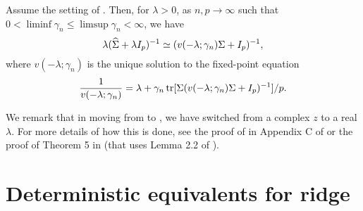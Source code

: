 \documentclass{article}
\begin{document}
\begin{corollary}
    \label{cor:basic-ridge-resolvent-equivalent-in-v}
    Assume the setting of 
    .
    Then, for $\lambda > 0$,
    as $n, p \to \infty$
    such that $0 < \liminf \gamma_n \le \limsup \gamma_n < \infty$,
    we have
    \[
        \lambda ({\widehat{\Sigma}} + \lambda I_p)^{-1}
        \simeq
        (v(-\lambda; \gamma_n) \Sigma + I_p)^{-1},
    \]
    where $v(-\lambda; \gamma_n)$
    is the unique solution to the fixed-point equation
    \[
        \frac{1}{v(-\lambda; \gamma_n)}
        =
        \lambda
        + \gamma_n \operatorname{tr}[\Sigma (v(-\lambda; \gamma_n) \Sigma + I_p)^{-1}] / p.
    \]
\end{corollary}

We remark that in moving from 
to
,
we have switched from a complex $z$ to a real $\lambda$.
For more details of how this is done,
see the proof of 
in Appendix C of \cite{patil_2022}
or the proof of Theorem 5 in \cite{hastie2022surprises}
(that uses
Lemma 2.2 of
\cite{knowles_yin_2017}).

\section{Deterministic equivalents for ridge}
\end{document}
